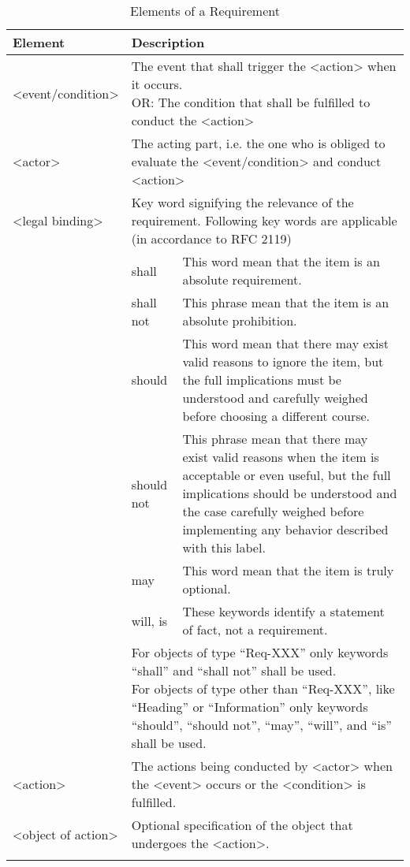	\begin{table}[h]
		\renewcommand{\arraystretch}{1.3}
		\centering
		\caption{Elements of a Requirement}
		\begin{tabular}{|p{2.5cm}|p{2cm}|p{6cm}|}  
			\specialrule{0.2em}{0pt}{0pt} 
			\centering \textbf{Element}  & \multicolumn{2}{l|}{\textbf{Description}}  \\    
			\hline
			\textcolor{winered}{<event/condition>}  & \multicolumn{2}{p{8cm}|}{The event that shall trigger the \textcolor{mygreen1}{<action>} when it occurs. \newline OR: The condition that shall be fulfilled to conduct the \textcolor{mygreen1}{<action>}} \\
			\hline
			\textcolor{mybule}{<actor>}  & \multicolumn{2}{p{8cm}|}{The acting part, i.e. the one who is obliged to evaluate the \textcolor{winered}{<event/condition>} and conduct \textcolor{mygreen1}{<action>}} \\
			\hline
			\textcolor{mypurple}{<legal binding>}   &  \multicolumn{2}{p{8cm}|}{Key word signifying the relevance of the requirement. Following key words are applicable (in accordance to RFC 2119)} \\
			\cline{2-3}
						&shall       & This word mean that the item is an absolute requirement. \\
						&shall not   & This phrase mean that the item is an absolute prohibition.\\
						&should      &This word mean that there may exist valid reasons to ignore
						the item, but the full implications must be understood and
						carefully weighed before choosing a different course.\\
						&should not           &This phrase mean that there may exist valid reasons
						when the item is acceptable or even useful, but the full
						implications should be understood and the case carefully
						weighed before implementing any behavior described with
						this label.\\
						&may          &This word mean that the item is truly optional.\\
						&will, is           &These keywords identify a statement of fact, not a
						requirement.\\
			\cline{2-3}
						&    \multicolumn{2}{p{8cm}|}{For objects of type “Req-XXX” only keywords “shall” and “shall not” shall
						be used.\newline
						For objects of type other than “Req-XXX”, like “Heading” or
						“Information” only keywords “should”, “should not”, “may”, “will”, and
						“is” shall be used.}\\
			\hline 
			\textcolor{mygreen1}{<action>}& \multicolumn{2}{p{8cm}|}{The actions being conducted by \textcolor{mybule}{<actor>} when the \textcolor{winered}{<event>} occurs or the
			\textcolor{winered}{<condition>} is fulfilled.}\\
			\hline
			\textcolor{mygreen2}{<object of action>} & \multicolumn{2}{p{8cm}|}{Optional specification of the object that undergoes the \textcolor{mygreen1}{<action>}.}\\
			\specialrule{0.2em}{0 pt}{0pt} 
		\end{tabular}
	\end{table}


